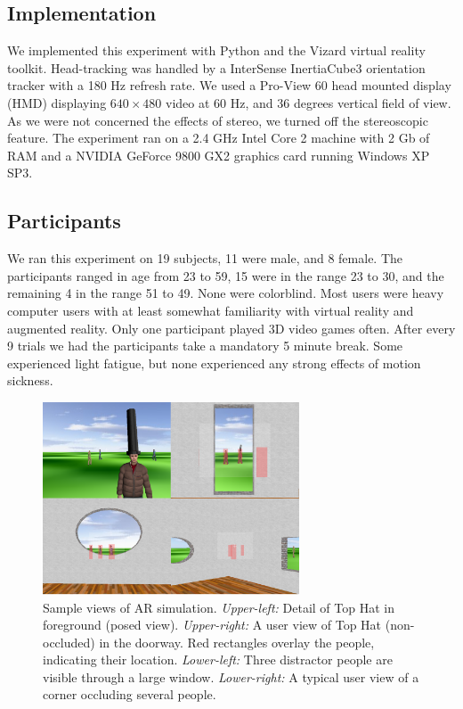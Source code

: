 \documentclass{acmsiggraph}                     %
\begin{document}
\subsection{Implementation}

We implemented this experiment with Python and the Vizard virtual reality toolkit.  Head-tracking was handled by a InterSense InertiaCube3 orientation tracker with a 180 Hz refresh rate.  We used a Pro-View 60 head mounted display (HMD) displaying $640\times480$ video at 60 Hz, and 36 degrees vertical field of view.  As we were not concerned the effects of stereo, we turned off the stereoscopic feature.  The experiment ran on a 2.4 GHz Intel Core 2 machine with 2 Gb of RAM and a NVIDIA GeForce 9800 GX2 graphics card running Windows XP SP3.

\subsection{Participants}

We ran this experiment on 19 subjects, 11 were male, and 8 female.  The participants ranged in age from 23 to 59, 15 were in the range 23 to 30, and the remaining 4 in the range 51 to 49.  None were colorblind.  Most users were heavy computer users with at least somewhat familiarity with virtual reality and augmented reality.  Only one participant played 3D video games often.  After every 9 trials we had the participants take a mandatory 5 minute break.  Some experienced light fatigue, but none experienced any strong effects of motion sickness.

\begin{figure}[t]
	\centering
	\includegraphics[width=3in]{figures/view_comp.png}
	\caption{Sample views of AR simulation.  \emph{Upper-left:} Detail of Top Hat in foreground (posed view).  \emph{Upper-right:} A user view of Top Hat (non-occluded) in the doorway.  Red rectangles overlay the people, indicating their location. \emph{Lower-left:} Three distractor people are visible through a large window.  \emph{Lower-right:} A typical user view of a corner occluding several people.}
\end{figure}
\end{document}
